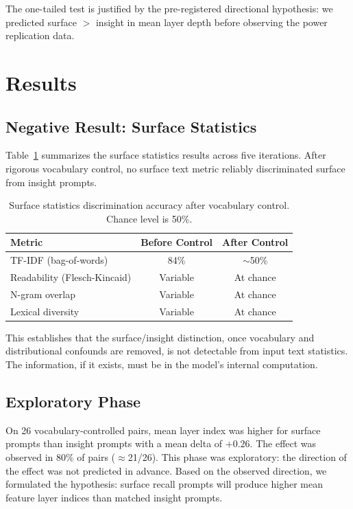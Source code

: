 \documentclass[10pt]{article}
\begin{document}
The one-tailed test is justified by the pre-registered directional hypothesis: we predicted surface $>$ insight in mean layer depth before observing the power replication data.

\section{Results}

\subsection{Negative Result: Surface Statistics}
\label{sec:negative}

Table~\ref{tab:surface_stats} summarizes the surface statistics results across five iterations. After rigorous vocabulary control, no surface text metric reliably discriminated surface from insight prompts.

\begin{table}[h]
\centering
\caption{Surface statistics discrimination accuracy after vocabulary control. Chance level is 50\%.}
\label{tab:surface_stats}
\begin{tabular}{lcc}
\toprule
\textbf{Metric} & \textbf{Before Control} & \textbf{After Control} \\
\midrule
TF-IDF (bag-of-words) & 84\% & $\sim$50\% \\
Readability (Flesch-Kincaid) & Variable & At chance \\
N-gram overlap & Variable & At chance \\
Lexical diversity & Variable & At chance \\
\bottomrule
\end{tabular}
\end{table}

This establishes that the surface/insight distinction, once vocabulary and distributional confounds are removed, is not detectable from input text statistics. The information, if it exists, must be in the model's internal computation.

\subsection{Exploratory Phase}

On 26 vocabulary-controlled pairs, mean layer index was higher for surface prompts than insight prompts with a mean delta of $+0.26$. The effect was observed in 80\% of pairs ($\approx$21/26). This phase was exploratory: the direction of the effect was not predicted in advance. Based on the observed direction, we formulated the hypothesis: surface recall prompts will produce higher mean feature layer indices than matched insight prompts.
\end{document}
